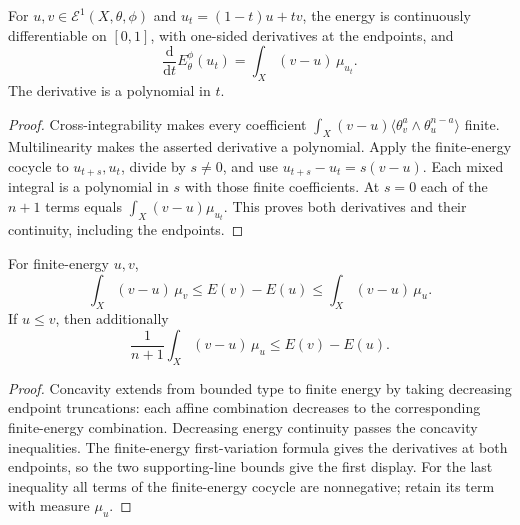 \begin{proposition}\label{prop:finite-energy-affine-first-variation}
For $u,v\in\mathcal E^1(X,\theta,\phi)$ and $u_t=(1-t)u+tv$, the energy is continuously differentiable on $[0,1]$, with one-sided derivatives at the endpoints, and
\[
 \frac{\mathrm d}{\mathrm dt}E_\theta^\phi(u_t)
                                  =\int_X(v-u)\,\mu_{u_t}.
\]
The derivative is a polynomial in $t$.
\end{proposition}
\begin{proof}
Cross-integrability makes every coefficient
$\int_X(v-u)\langle\theta_v^a\wedge\theta_u^{n-a}\rangle$ finite. Multilinearity makes the asserted derivative a polynomial. Apply the finite-energy cocycle to $u_{t+s},u_t$, divide by $s\ne0$, and use $u_{t+s}-u_t=s(v-u)$. Each mixed integral is a polynomial in $s$ with those finite coefficients. At $s=0$ each of the $n+1$ terms equals $\int_X(v-u)\mu_{u_t}$. This proves both derivatives and their continuity, including the endpoints.
\end{proof}

\begin{lemma}\label{lem:relative-energy-tangent-and-order-bounds}
For finite-energy $u,v$,
\[
 \int_X(v-u)\,\mu_v\leq E(v)-E(u)
                                  \leq\int_X(v-u)\,\mu_u.
\]
If $u\leq v$, then additionally
\[
 \frac1{n+1}\int_X(v-u)\,\mu_u\leq E(v)-E(u).
\]
\end{lemma}
\begin{proof}
Concavity extends from bounded type to finite energy by taking decreasing endpoint truncations: each affine combination decreases to the corresponding finite-energy combination. Decreasing energy continuity passes the concavity inequalities. The finite-energy first-variation formula gives the derivatives at both endpoints, so the two supporting-line bounds give the first display. For the last inequality all terms of the finite-energy cocycle are nonnegative; retain its term with measure $\mu_u$.
\end{proof}

